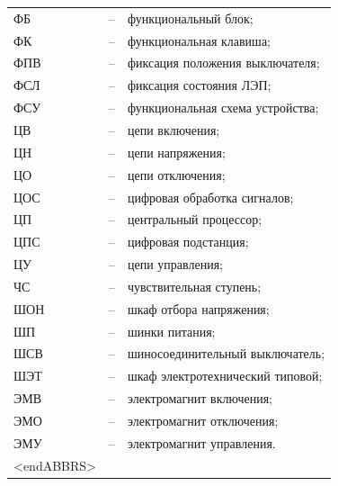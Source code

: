 \begin{longtable}{L{2cm} L{0.5cm} L{20cm}}
ФБ & -- & функциональный блок; \\
ФК & -- & функциональная клавиша; \\
ФПВ & -- & фиксация положения выключателя; \\
ФСЛ & -- & фиксация состояния ЛЭП; \\
ФСУ & -- & функциональная схема устройства; \\
ЦВ & -- & цепи включения; \\
ЦН & -- & цепи напряжения; \\
ЦО & -- & цепи отключения; \\
ЦОС & -- & цифровая обработка сигналов; \\
ЦП & -- & центральный процессор; \\
ЦПС & -- & цифровая подстанция; \\
ЦУ & -- & цепи управления; \\
ЧС & -- & чувствительная ступень; \\
ШОН & -- & шкаф отбора напряжения; \\
ШП & -- & шинки питания; \\
ШСВ & -- & шиносоединительный выключатель; \\
ШЭТ & -- & шкаф электротехнический типовой; \\
ЭМВ & -- & электромагнит включения; \\
ЭМО & -- & электромагнит отключения; \\
ЭМУ & -- & электромагнит управления. \\
{\color{white}\fontsize{0.1pt}{0.1pt}\selectfont<endABBRS>}
\end{longtable}